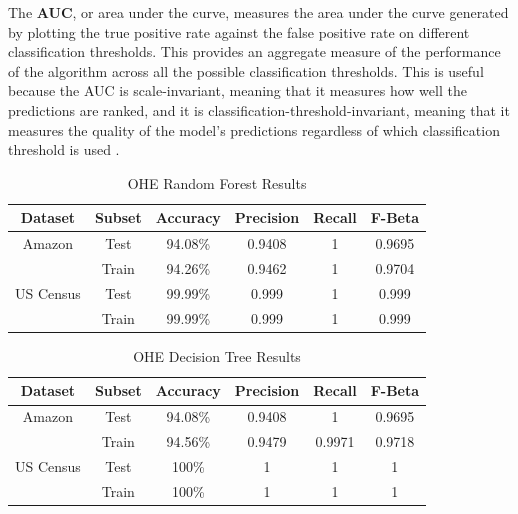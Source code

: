 \documentclass[12pt,letterpaper]{article}
\theoremstyle{plain}
\theoremstyle{definition}
\begin{document}
\hspace{\parindent}The \textbf{AUC}, or area under the curve, measures the area under the curve generated by plotting the true positive rate against the false positive rate on different classification thresholds. This provides an aggregate measure of the performance of the algorithm across all the possible classification thresholds. This is useful because the AUC is scale-invariant, meaning that it measures how well the predictions are ranked, and it is classification-threshold-invariant, meaning that it measures the quality of the model's predictions regardless of which classification threshold is used \cite{classificationaucroc}. 

\begin{table}[H]
\caption{OHE Random Forest Results} \label{tab:OHErf}
\begin{center}
\begin{tabular}{|c|c|c|c|c|c|}
\hline
Dataset & Subset & Accuracy & Precision & Recall & F-Beta \\ \hline
Amazon & Test & 94.08\% & 0.9408 & 1 & 0.9695 \\ \hline
 & Train & 94.26\% & 0.9462 & 1 & 0.9704 \\ \hline
US Census & Test & 99.99\% & 0.999 & 1 & 0.999 \\ \hline
 & Train & 99.99\% & 0.999 & 1 & 0.999 \\ \hline
\end{tabular}
\end{center}
\end{table}

\begin{table}[H]
\caption{OHE Decision Tree Results} \label{tab:OHEdt}
\begin{center}
\begin{tabular}{|c|c|c|c|c|c|}
\hline
Dataset & Subset & Accuracy & Precision & Recall & F-Beta \\ \hline
Amazon & Test & 94.08\% & 0.9408 & 1 & 0.9695 \\ \hline
 & Train & 94.56\% & 0.9479 & 0.9971 & 0.9718 \\ \hline
US Census & Test & 100\% & 1 & 1 & 1 \\ \hline
 & Train & 100\% & 1 & 1 & 1 \\ \hline
\end{tabular}
\end{center}
\end{table}
\end{document}

